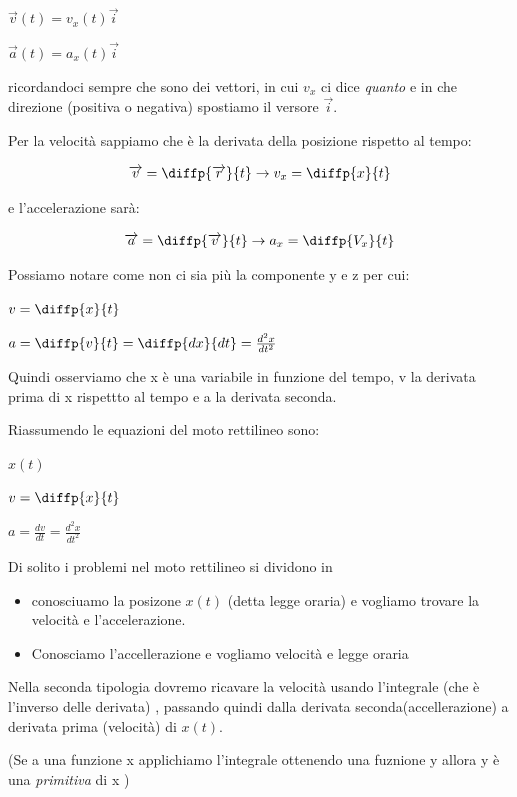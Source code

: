 $\overrightarrow{v}(t)=v_{x}(t)\overrightarrow{i}$ 

$\overrightarrow{a}(t)=a_{x}(t)\overrightarrow{i}$ 

ricordandoci sempre che sono dei vettori, 
in cui $v_x$ ci dice \textit{quanto} e in che direzione
(positiva o negativa) spostiamo 
il versore $\overrightarrow{i}$.

Per la velocità sappiamo che è la derivata della posizione rispetto
al tempo:

\begin{equation}
\overrightarrow{v}=\diffp{\overrightarrow{r}}{t} \rightarrow v_x=\diffp{x}{t}
\end{equation}

e l'accelerazione sarà:

\begin{equation}
    \overrightarrow{a}=\diffp{\overrightarrow{v}}{t} \rightarrow a_x=\diffp{V_x}{t}
\end{equation}

Possiamo notare come non ci sia più la componente y e z per cui:

$v=\diffp{x}{t}$

$a=\diffp{v}{t}=\diffp{dx}{dt}=\frac{d^2x}{dt^2}$

Quindi osserviamo che x è una variabile in funzione del tempo, 
v la derivata prima di x rispettto al tempo e a la derivata seconda.

Riassumendo le equazioni del moto rettilineo sono:

$x(t)$

$v=\diffp{x}{t}$

$a=\frac{dv}{dt}=\frac{d^2x}{d t^2}$

Di solito i problemi nel moto rettilineo si dividono in 

\begin{itemize}
\item conosciuamo la posizone
$x(t)$ (detta legge oraria) e vogliamo trovare la velocità e l'accelerazione.

\item Conosciamo l'accellerazione e vogliamo velocità e legge oraria
\end{itemize}

Nella seconda tipologia dovremo ricavare la velocità usando l'integrale
(che è l'inverso delle derivata) , passando quindi dalla derivata seconda(accellerazione)
a derivata prima (velocità) di $x(t)$.

(Se a una funzione x applichiamo l'integrale ottenendo
una fuznione y 
allora y è una \textit{primitiva} di x )

